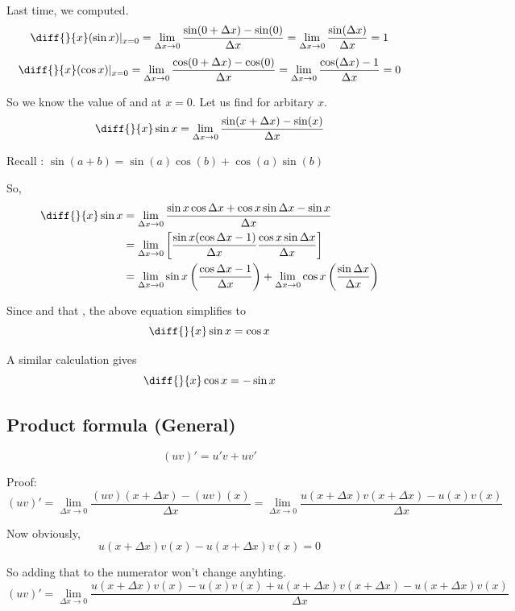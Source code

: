 Last time, we computed.
\[
	\diff{}{x} (\sin x) |_{\substack{x=0}}
		= \lim_{\Delta x \to 0} \frac{\sin(0 + \Delta x) - \sin(0) }{\Delta x}
		= \lim_{\Delta x \to 0} \frac{\sin(\Delta x)}{\Delta x} = 1
\]
\[
	\diff{}{x} (\cos x) |_{\substack{x=0}}
        = \lim_{\Delta x \to 0} \frac{\cos(0 + \Delta x) - \cos(0) }{\Delta x}
		= \lim_{\Delta x \to 0} \frac{\cos(\Delta x)-1}{\Delta x} = 0
\]


So we know the value of  and  at $x = 0$. Let us find for arbitary $x$. 
$$\diff{}{x} \sin x = \lim_{\Delta x \to 0} \frac{\sin(x+\Delta x) - \sin(x)}{\Delta x}$$

Recall : $\sin(a+b) = \sin(a)\cos(b) + \cos(a)\sin(b)$

So,
\begin{align*}
	\diff{}{x} \sin x 
		& = \lim_{\Delta x \to 0} \frac{\sin x \cos \Delta x + \cos x \sin \Delta x - \sin x}{\Delta x} \\
		& = \lim_{\Delta x \to 0} \left[ \frac{\sin x (\cos \Delta x - 1)}{\Delta x} \frac{\cos x \sin \Delta x}{\Delta x} \right] \\
		& = \lim_{\Delta x \to 0} \sin x \left( \frac{\cos \Delta x - 1}{\Delta x} \right) + \lim_{\Delta x \to 0} \cos x \left( \frac{\sin \Delta x}{\Delta x} \right)
\end{align*}

Since  and that , the above equation simplifies to $$\diff{}{x} \sin x = \cos x$$

A similar calculation gives
$$\diff{}{x} \cos x = - \sin x$$


\subsection{Product formula (General)}

$$(uv)' = u'v+uv'$$

Proof:
$$(uv)' = \lim_{\Delta x \to 0} \frac{(uv)(x+\Delta x) - (uv)(x)}{\Delta x}
		= \lim_{\Delta x \to 0} \frac{u(x+\Delta x)v(x+\Delta x) - u(x)v(x)}{\Delta x}$$

Now obviously, $$u(x+\Delta x)v(x) - u(x+\Delta x)v(x) = 0$$

So adding that to the numerator won't change anyhting.
$$
(uv)' = \lim_{\Delta x \to 0} 
	\frac{
		u(x+\Delta x)v(x)
		- u(x)v(x)
		+ u(x+\Delta x)v(x+\Delta x)
		- u(x+\Delta x)v(x)
	}{\Delta x}
$$

